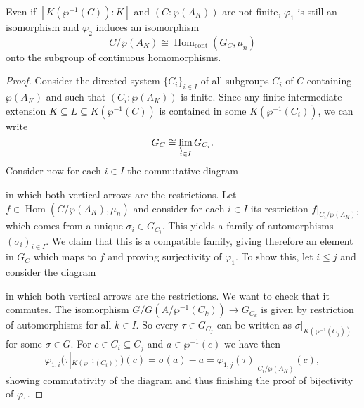 \documentclass[12pt]{amsart}
\DeclareMathOperator{\Hom}{Hom}
\begin{document}
\begin{prop}\label{prop:infinitecase}
    Even if $[K(\wp^{-1}(C)):K]$ and $(C:\wp(A_{K}))$ are not finite, $\varphi_{1}$ is still an isomorphism and $\varphi_{2}$ induces an isomorphism
    \[ C/\wp(A_{K})\cong \Hom_{\mathrm{cont}}(G_{C},\mu_{n}) \]
    onto the subgroup of continuous homomorphisms.
    \begin{proof}
	Consider the directed system $\{ C_{i} \}_{i\in I}$ of all subgroups $C_{i}$ of $C$ containing $\wp(A_{K})$ and such that $(C_{i}:\wp(A_{K}))$ is finite.
	Since any finite intermediate extension $K\subseteq L\subseteq K(\wp^{-1}(C))$ is contained in some $K(\wp^{-1}(C_{i}))$, we can write
	\[ G_{C}\cong \varprojlim_{i\in I} G_{C_{i}}. \]
	Consider now for each $i\in I$ the commutative diagram
	\begin{center}
	\end{center}
	in which both vertical arrows are the restrictions.
	Let $f\in \Hom(C/\wp(A_{K}),\mu_{n})$ and consider for each $i\in I$ its restriction $f|_{C_{i}/\wp(A_{K})}$, which comes from a unique $\sigma_{i}\in G_{C_{i}}$.
	This yields a family of automorphisms $(\sigma_{i})_{i\in I}$.
	We claim that this is a compatible family, giving therefore an element in $G_{C}$ which maps to $f$ and proving surjectivity of $\varphi_{1}$.
	To show this, let $i\leqslant j$ and consider the diagram
	\begin{center}
	\end{center}
	in which both vertical arrows are the restrictions.
	We want to check that it commutes.
	The isomorphism $G/G(A/\wp^{-1}(C_{k}))\to G_{C_{k}}$ is given by restriction of automorphisms for all $k\in I$.
	So every $\tau\in G_{C_{j}}$ can be written as $\sigma|_{K(\wp^{-1}(C_{j}))}$ for some $\sigma\in G$.
	For $c\in C_{i}\subseteq C_{j}$ and $a\in \wp^{-1}(c)$ we have then
	\[ \varphi_{1,i}(\tau|_{K(\wp^{-1}(C_{i}))})(\bar{c})=\sigma(a)-a=\varphi_{1,j}(\tau)|_{C_{i}/\wp(A_{K})}(\bar{c}), \]
	showing commutativity of the diagram and thus finishing the proof of bijectivity of $\varphi_{1}$.


\end{proof}
\end{prop}
\end{document}
